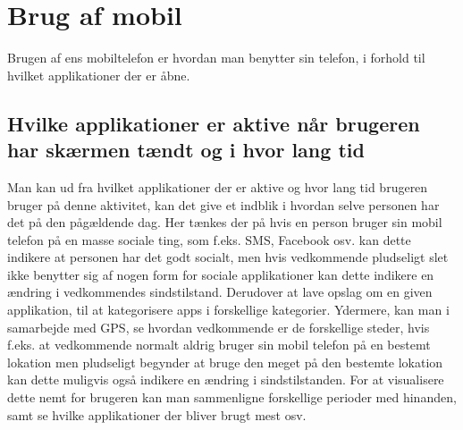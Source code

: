\section{Brug af mobil}
Brugen af ens mobiltelefon er hvordan man benytter sin telefon, i forhold til hvilket applikationer der er åbne.

\subsection{Hvilke applikationer er aktive når brugeren har skærmen tændt og i hvor lang tid}
Man kan ud fra hvilket applikationer der er aktive og hvor lang tid brugeren bruger på denne aktivitet, kan det give et indblik i hvordan selve personen har det på den pågældende dag.
Her tænkes der på hvis en person bruger sin mobil telefon på en masse sociale ting, som f.eks. SMS, Facebook osv. kan dette indikere at personen har det godt socialt, men hvis vedkommende pludseligt slet ikke benytter sig af nogen form for sociale applikationer kan dette indikere en ændring i vedkommendes sindstilstand.
Derudover at lave opslag om en given applikation, til at kategorisere apps i forskellige kategorier.
Ydermere, kan man i samarbejde med GPS, se hvordan vedkommende er de forskellige steder, hvis f.eks. at vedkommende normalt aldrig bruger sin mobil telefon på en bestemt lokation men pludseligt begynder at bruge den meget på den bestemte lokation kan dette muligvis også indikere en ændring i sindstilstanden.
For at visualisere dette nemt for brugeren kan man sammenligne forskellige perioder med hinanden, samt se hvilke applikationer der bliver brugt mest osv.

